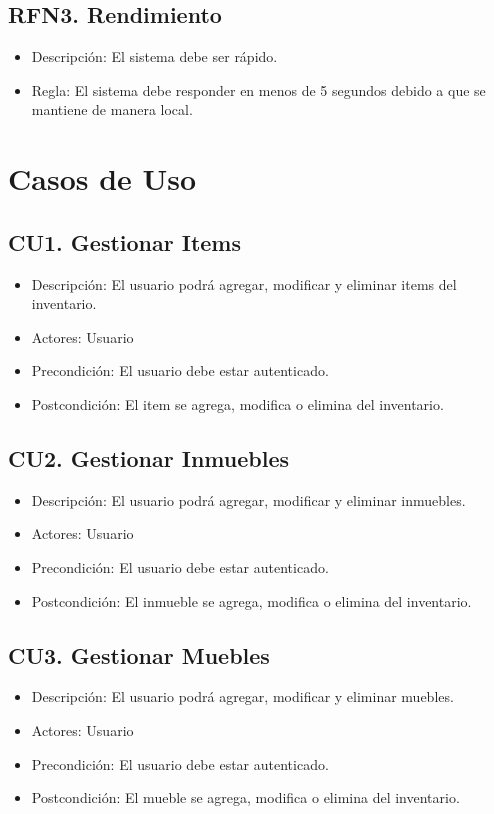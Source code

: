 \documentclass{article}
\begin{document}
\subsection{RFN3. Rendimiento}
\begin{itemize}
    \item Descripción: El sistema debe ser rápido.
    \item Regla: El sistema debe responder en menos de 5 segundos debido a que se mantiene de manera local.
\end{itemize}

\section{Casos de Uso}
\subsection{CU1. Gestionar Items}
\begin{itemize}
    \item Descripción: El usuario podrá agregar, modificar y eliminar items del inventario.
    \item Actores: Usuario
    \item Precondición: El usuario debe estar autenticado.
    \item Postcondición: El item se agrega, modifica o elimina del inventario.
\end{itemize}

\subsection{CU2. Gestionar Inmuebles}
\begin{itemize}
    \item Descripción: El usuario podrá agregar, modificar y eliminar inmuebles.
    \item Actores: Usuario
    \item Precondición: El usuario debe estar autenticado.
    \item Postcondición: El inmueble se agrega, modifica o elimina del inventario.
\end{itemize}

\subsection{CU3. Gestionar Muebles}
\begin{itemize}
    \item Descripción: El usuario podrá agregar, modificar y eliminar muebles.
    \item Actores: Usuario
    \item Precondición: El usuario debe estar autenticado.
    \item Postcondición: El mueble se agrega, modifica o elimina del inventario.
\end{itemize}
\end{document}
